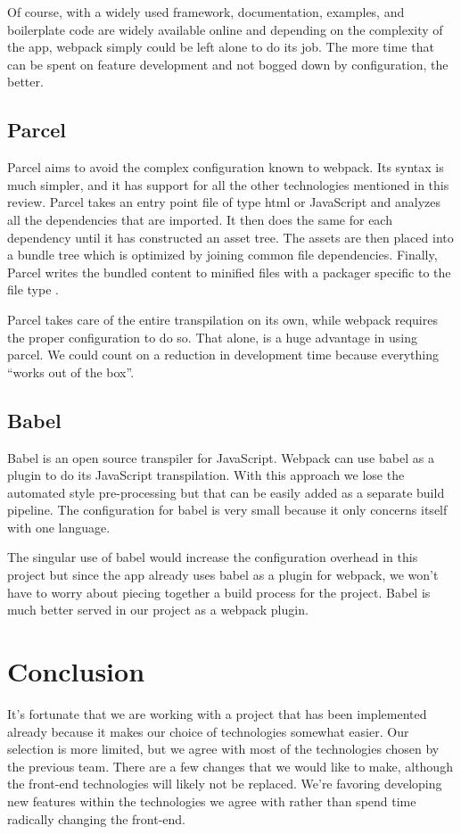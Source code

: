 \documentclass[draftclsnofoot,onecolumn,journal,letterpaper,compsoc,10pt]{IEEEtran}
\begin{document}
        Of course, with a widely used framework, documentation, examples, and boilerplate code are widely available online and depending on the complexity of the app, webpack simply could be left alone to do its job. The more time that can be spent on feature development and not bogged down by configuration, the better.

        \subsection{Parcel}
        Parcel aims to avoid the complex configuration known to webpack. Its syntax is much simpler, and it has support for all the other technologies mentioned in this review. Parcel takes an entry point file of type html or JavaScript and analyzes all the dependencies that are imported. It then does the same for each dependency until it has constructed an asset tree. The assets are then placed into a bundle tree which is optimized by joining common file dependencies. Finally, Parcel writes the bundled content to minified files with a packager specific to the file type \cite{parcel}.
        
        Parcel takes care of the entire transpilation on its own, while webpack requires the proper configuration to do so. That alone, is a huge advantage in using parcel. We could count on a reduction in development time because everything “works out of the box”. 

        \subsection{Babel}
        Babel is an open source transpiler for JavaScript. Webpack can use babel as a plugin to do its JavaScript transpilation. With this approach we lose the automated style pre-processing but that can be easily added as a separate build pipeline. The configuration for babel is very small because it only concerns itself with one language.
        
        The singular use of babel would increase the configuration overhead in this project but since the app already uses babel as a plugin for webpack, we won’t have to worry about piecing together a build process for the project. Babel is much better served in our project as a webpack plugin.
    
    \section{Conclusion}
    It's fortunate that we are working with a project that has been implemented already because it makes our choice of technologies somewhat easier. Our selection is more limited, but we agree with most of the technologies chosen by the previous team. There are a few changes that we would like to make, although the front-end technologies will likely not be replaced. We're favoring developing new features within the technologies we agree with rather than spend time radically changing the front-end. \\
        
\nocite{*}%


\end{document}
